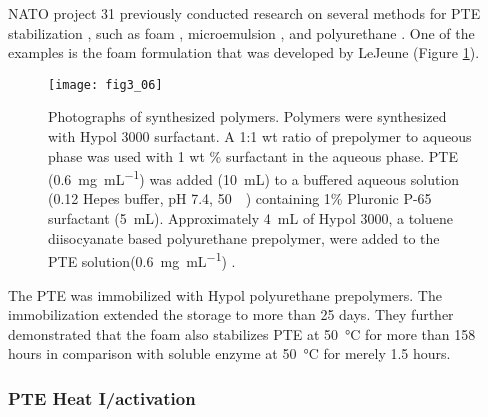 \begin{refsection}
NATO project 31 previously conducted research on several methods for PTE
stabilization \cite{Defrank}, such as foam \cite{LeJeune1997a}, microemulsion
\cite{Cheng1996}, and polyurethane \cite{Defrank}. One of the examples is
the foam formulation that was developed by LeJeune 
\cite{LeJeune1997a} (Figure \ref{fig:pte-foam}).
\begin{figure}[htbp]
    \centering \texttt{[image: fig3\_06]}
    \caption[Photographs of synthesized polymers. Polymers were synthesized
    with Hypol 3000 surfactant. A 1:1 wt ratio of prepolymer to aqueous phase
    was used with 1 wt \% surfactant in the aqueous phase. PTE
    (\SI{0.6}{\mg\per\mL}) was added (\SI{10}{\mL}) to a buffered aqueous
    solution (\SI{0.12}{\Molar} Hepes buffer, pH 7.4,
    \SI{50}{\milli\Molar}) containing 1 \% Pluronic P-65 surfactant
    (\SI{5}{\mL}). Approximately \SI{4}{\mL} of Hypol 3000, a toluene
    diisocyanate based polyurethane prepolymer, were added to the PTE
solution(\SI{0.6}{\mg\per\mL}).]{Photographs of synthesized polymers. Polymers
    were synthesized with Hypol 3000 surfactant. A 1:1 wt ratio of prepolymer
    to aqueous phase was used with 1 wt \% surfactant in the aqueous phase. PTE
    (\SI{0.6}{\mg\per\mL}) was added (\SI{10}{\mL}) to a buffered aqueous
    solution (\SI{0.12}{\Molar} Hepes buffer, pH 7.4,
    \SI{50}{\milli\Molar}) containing 1\% Pluronic P-65 surfactant
    (\SI{5}{\mL}). Approximately \SI{4}{\mL} of Hypol 3000, a toluene
    diisocyanate based polyurethane prepolymer, were added to the PTE
    solution(\SI{0.6}{\mg\per\mL}) \cite{LeJeune1997a}.} 
    \label{fig:pte-foam}
\end{figure}

The PTE was immobilized with Hypol polyurethane prepolymers. The immobilization
extended the storage to more than 25 days. They further demonstrated that the
foam also stabilizes PTE at \SI{50}{\celsius} for more than 158 hours in
comparison with soluble enzyme at \SI{50}{\celsius} for merely 1.5 hours. 

\subsubsection{PTE Heat I/activation}


\end{refsection}
